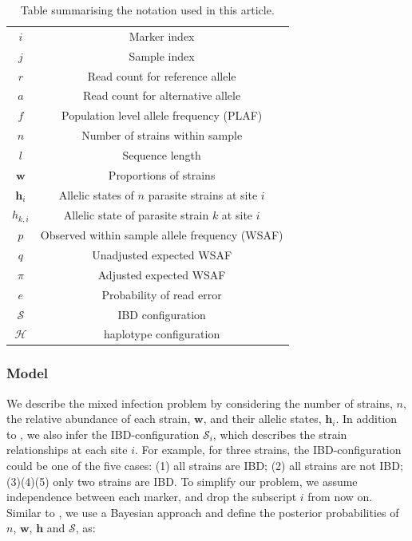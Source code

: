 \documentclass{article}
\begin{document}
\begin{table}[htb]\centering
\begin{tabular}{c|c}\hline
$i$              & Marker index\\
$j$              & Sample index \\
$r$              & Read count for reference allele \\
$a$              & Read count for alternative allele \\
$f$              & Population level allele frequency (PLAF) \\
$n$              & Number of strains within sample \\
$l$              & Sequence length \\
$\mathbf{w}$      & Proportions of strains \\
$\mathbf{h}_{i}$ & Allelic states of $n$ parasite strains at site $i$ \\
$h_{k,i}$   & Allelic state of parasite strain $k$ at site $i$\\
$p$              & Observed within sample allele frequency (WSAF) \\
$q$              & Unadjusted expected WSAF  \\
$\pi$            & Adjusted expected WSAF \\
$e$              & Probability of read error\\
$\mathcal{S}$ & IBD configuration \\
$\mathcal{H}$ & haplotype configuration \\
\hline
\end{tabular}
\caption{Table summarising the notation used in this article.}\label{tab:notation}
\end{table}

\subsubsection{Model}

We describe the mixed infection problem by considering the number of strains, $n$, the relative abundance of each strain, $\mathbf{w}$, and their allelic states, $\mathbf{h}_{i}$. In addition to \citet{Zhu2017}, we also infer the IBD-configuration $\mathcal{S}_{i}$, which describes the strain relationships at each site $i$. For example, for three strains, the IBD-configuration could be one of the five cases: (1) all strains are IBD; (2) all strains are not IBD; (3)(4)(5) only two strains are IBD. To simplify our problem, we assume independence between each marker, and drop the subscript $i$ from now on. Similar to \citet{Jack2016}, we use a Bayesian approach and define the posterior probabilities of $n$, $\mathbf{w}$, $\mathbf{h}$ and $\mathcal{S}$,  as:
\end{document}
